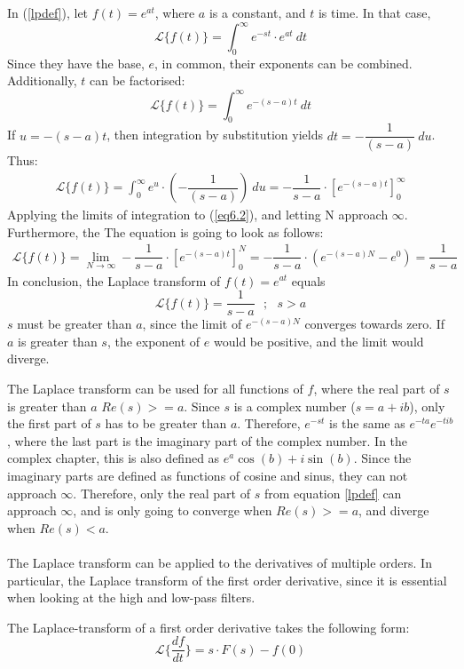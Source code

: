 \begin{tcolorbox}[colback=red!5!white,colframe=red!55!black,title=Example of a Laplace transform]
In (\ref{lpdef}), let $f(t)=e^{at}$, where $a$ is a constant, and $t$ is time. In that case,
$$\mathcal{L}\{f(t)\}=\int_{0}^{\infty} e^{-st}\cdot e^{at}\ dt$$
Since they have the base, $e$, in common, their exponents can be combined. Additionally, $t$ can be factorised:
$$\mathcal{L}\{f(t)\}=\int_{0}^{\infty} e^{-(s-a)t}\ dt$$
If $u=-(s-a)t$, then integration by substitution yields $dt=-\dfrac{1}{(s-a)}\ du$. Thus:
\begin{align}
\mathcal{L}\{f(t)\}=\int_{0}^{\infty} e^{u}\cdot (-\dfrac{1}{(s-a)})\ du =  -\dfrac{1}{s-a} \cdot \left[e^{-(s-a)t} \right]_{0}^{\infty}
\label{eq6.2}
\end{align}
Applying the limits of integration to (\ref{eq6.2}), and letting N approach $\infty$. Furthermore, the The equation is going to look as follows:
\begin{align*}
\mathcal{L}\{f(t)\} = \lim_{N \to \infty} -\dfrac{1}{s-a} \cdot \left[e^{-(s-a)t} \right]_{0}^{N} =-\dfrac{1}{s-a}\cdot (e^{-(s-a)N}-e^{0})=\dfrac{1}{s-a}
\end{align*}
In conclusion, the Laplace transform of $f(t)=e^{at}$ equals
$$\mathcal{L}\{f(t)\}=\dfrac{1}{s-a} \ \ \ ;\ \ \ s>a$$
$s$ must be greater than $a$, since the limit of $e^{-(s-a)N}$ converges towards zero. If $a$ is greater than $s$, the exponent of $e$ would be positive, and the limit would diverge. 
\end{tcolorbox}
The Laplace transform can be used for all functions of $f$, where the real part of $s$ is greater than $a$ $Re(s)>=a$. Since $s$ is a complex number ($s=a+ib$), only the first part of $s$ has to be greater than $a$. Therefore, $e^{-st}$ is  the same as $e^{-ta}e^{-tib}$, where the last part is the imaginary part of the complex number. In the complex chapter, this is also defined as $e^{a}\cos(b)+ i \sin(b)$. Since the imaginary parts are defined as functions of cosine and sinus, they can not approach $\infty$. Therefore, only the real part of $s$ from equation \eqref{lpdef} can approach $\infty$, and is only going to converge when $Re(s) >= a$, and diverge when $Re(s)<a$.
\\ \\
The Laplace transform can be applied to the derivatives of multiple orders. In particular, the Laplace transform of the first order derivative, since it is essential when looking at the high and low-pass filters. 
\begin{tcolorbox}[colback=green!5!white,colframe=green!40!black,title=Theorem 6.1: Laplace transform of a first order derivative]
The Laplace-transform of a first order derivative takes the following form:
$$\mathcal{L}\{\frac{df}{dt}\} = s\cdot F(s)-f(0)$$
\end{tcolorbox}

